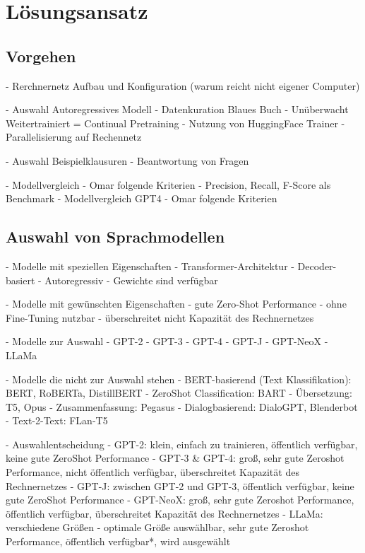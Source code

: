 \chapter{Lösungsansatz}\label{ch:approach}
\section*{Vorgehen}
- Rerchnernetz Aufbau und Konfiguration (warum reicht nicht eigener Computer)

- Auswahl Autoregressives Modell
- Datenkuration Blaues Buch
- Unüberwacht Weitertrainiert = Continual Pretraining
    - Nutzung von HuggingFace Trainer
    - Parallelisierung auf Rechennetz

- Auswahl Beispielklausuren
- Beantwortung von Fragen

- Modellvergleich
    - Omar folgende Kriterien
    - Precision, Recall, F-Score als Benchmark
- Modellvergleich GPT4
    - Omar folgende Kriterien

\section{Auswahl von Sprachmodellen}

- Modelle mit speziellen Eigenschaften
    - Transformer-Architektur
    - Decoder-basiert
    - Autoregressiv
    - Gewichte sind verfügbar

- Modelle mit gewünschten Eigenschaften
    - gute Zero-Shot Performance
    - ohne Fine-Tuning nutzbar
    - überschreitet nicht Kapazität des Rechnernetzes

- Modelle zur Auswahl
    - GPT-2
    - GPT-3
    - GPT-4
    - GPT-J
    - GPT-NeoX
    - LLaMa

- Modelle die nicht zur Auswahl stehen
    - BERT-basierend (Text Klassifikation): BERT, RoBERTa, DistillBERT
    - ZeroShot Classification: BART
    - Übersetzung: T5, Opus
    - Zusammenfassung: Pegasus
    - Dialogbasierend: DialoGPT, Blenderbot
    - Text-2-Text: FLan-T5


- Auswahlentscheidung
    - GPT-2: klein, einfach zu trainieren, öffentlich verfügbar, keine gute ZeroShot Performance
    - GPT-3 \& GPT-4: groß, sehr gute Zeroshot Performance, nicht öffentlich verfügbar, überschreitet Kapazität des Rechnernetzes
    - GPT-J: zwischen GPT-2 und GPT-3, öffentlich verfügbar, keine gute ZeroShot Performance
    - GPT-NeoX: groß, sehr gute Zeroshot Performance, öffentlich verfügbar, überschreitet Kapazität des Rechnernetzes
    - LLaMa: verschiedene Größen - optimale Größe auswählbar, sehr gute Zeroshot Performance, öffentlich verfügbar*, wird ausgewählt


